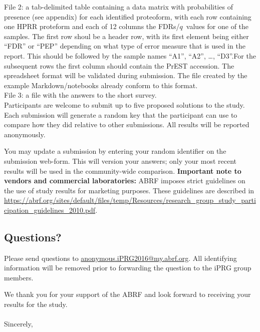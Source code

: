 \documentclass[a4paper,12pt]{article}
\begin{document}
File 2:  a tab-delimited table containing a data matrix with probabilities of presence (see appendix) for each identified proteoform, with each row containing one HPRR proteform and each of 12 columns the FDRs/$q$~values for one of the samples. The first row shoul be a header row, with its first element being either ``FDR'' or ``PEP'' depending on what type of error measure that is used in the report. This should be followed by the sample names ``A1'', ``A2'', \ldots, ``D3''.For the subsequent rows the first column should contain the PrEST accession. The spreadsheet format will be validated during submission. The file created by the example Markdown/notebooks already conform to this format.\\

File 3: a file with the answers to the short survey.\\

Participants are welcome to submit up to five proposed solutions to the study. Each submission will generate a random key that the participant can use to compare how they did relative to other submissions. All results will be reported anonymously.

You may update a submission by entering your random identifier on the submission web-form. This will version your answers; only your most recent results will be used in the community-wide comparison. 
\clearpage
\textbf{Important note to vendors and commercial laboratories:} ABRF imposes strict guidelines on the use of study results for marketing purposes. These guidelines are described in \url{https://abrf.org/sites/default/files/temp/Resources/research_group_study_participation_guidelines_2010.pdf}.

\subsection*{Questions?}
 Please send questions to \url{anonymous.iPRG2016@my.abrf.org}. All identifying information will be removed prior to forwarding the question to the iPRG group members.

We thank you for your support of the ABRF and look forward to receiving your results for the study.\\
\\

Sincerely,
 
\end{document}

